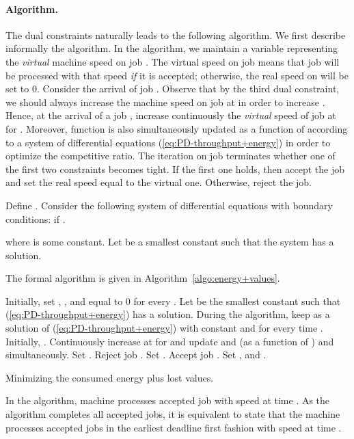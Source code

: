 \documentclass[11pt]{article}
\begin{document}
\paragraph{Algorithm.} The dual constraints naturally leads to the following algorithm. We first describe
informally the algorithm. 
In the algorithm, we maintain a variable  representing the 
\emph{virtual} machine speed on job . The virtual speed on job  means 
that job  will be processed with that speed \emph{if} it is accepted; otherwise, 
the real speed on  will be set to 0. 
Consider the arrival of job . Observe that by the third dual constraint, 
we should always increase the machine speed on job 
at  in order to increase .
Hence, at the arrival of a job , increase continuously the \emph{virtual} 
speed  of job  at  for .
Moreover, function  is also simultaneously 
updated as a function of  
according to a system of differential equations
(\ref{eq:PD-throughput+energy}) in order to optimize the competitive ratio.
The iteration on job  terminates whether one of the first two constraints becomes tight. 
If the first one holds, then accept the job and set the real speed equal to 
the virtual one. Otherwise, reject the job.

Define .
Consider the following system of differential equations with 
boundary conditions:  if .

where  is some constant. Let  be a smallest constant such that the system has 
a solution. 

The formal algorithm is given in Algorithm~\ref{algo:energy+values}. 

\begin{algorithm}[htbp]
\begin{algorithmic}[1] 
\STATE Initially, set , ,  and  equal to 0 for every .
\STATE Let  be the smallest constant such that  
	(\ref{eq:PD-throughput+energy}) has a solution. During the algorithm, keep 
	as a solution of (\ref{eq:PD-throughput+energy}) with constant  and 
	for every time .
	\STATE Initially, .
		\STATE Continuously increase  at   for 
		and update  and  (as a function of ) and
		 simultaneously. 
	\ENDWHILE
	\STATE Set .
		\STATE Reject job .
		\STATE Set .
	\ELSE
		\STATE Accept job .
		\STATE Set ,  
			     and .
	\ENDIF
\ENDFOR
\end{algorithmic}
\caption{Minimizing the consumed energy plus lost values.}
\label{algo:energy+values}
\end{algorithm}


In the algorithm, machine  processes accepted job  with speed  at time .
As the algorithm completes all accepted jobs, it is equivalent to state that the machine
processes accepted jobs in the earliest deadline first fashion with speed  at time .
\end{document}
